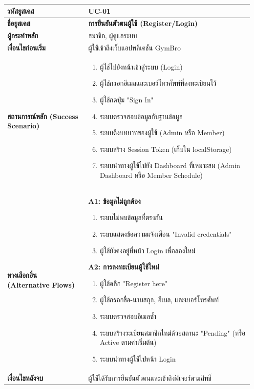 \begin{longtable}{|p{3cm}|p{12cm}|}
\hline
\textbf{รหัสยูสเคส} & UC-01 \\ \hline
\textbf{ชื่อยูสเคส} & \textbf{การยืนยันตัวตนผู้ใช้ (Register/Login)} \\ \hline
\textbf{ผู้กระทำหลัก} & สมาชิก, ผู้ดูแลระบบ \\ \hline
\textbf{เงื่อนไขก่อนเริ่ม} & ผู้ใช้เข้าถึงเว็บแอปพลิเคชัน GymBro \\ \hline
\textbf{สถานการณ์หลัก (Success Scenario)} & 
\begin{enumerate}
    \item ผู้ใช้ไปยังหน้าเข้าสู่ระบบ (Login)
    \item ผู้ใช้กรอกอีเมลและเบอร์โทรศัพท์ที่ลงทะเบียนไว้
    \item ผู้ใช้กดปุ่ม "Sign In"
    \item ระบบตรวจสอบข้อมูลกับฐานข้อมูล
    \item ระบบดึงบทบาทของผู้ใช้ (Admin หรือ Member)
    \item ระบบสร้าง Session Token (เก็บใน localStorage)
    \item ระบบนำทางผู้ใช้ไปยัง Dashboard ที่เหมาะสม (Admin Dashboard หรือ Member Schedule)
\end{enumerate} \\ \hline
\textbf{ทางเลือกอื่น (Alternative Flows)} & 
\textbf{A1: ข้อมูลไม่ถูกต้อง}
\begin{enumerate}
    \item ระบบไม่พบข้อมูลที่ตรงกัน
    \item ระบบแสดงข้อความแจ้งเตือน "Invalid credentials"
    \item ผู้ใช้ยังคงอยู่ที่หน้า Login เพื่อลองใหม่
\end{enumerate}
\textbf{A2: การลงทะเบียนผู้ใช้ใหม่}
\begin{enumerate}
    \item ผู้ใช้คลิก "Register here"
    \item ผู้ใช้กรอกชื่อ-นามสกุล, อีเมล, และเบอร์โทรศัพท์
    \item ระบบตรวจสอบอีเมลซ้ำ
    \item ระบบสร้างระเบียนสมาชิกใหม่ด้วยสถานะ "Pending" (หรือ Active ตามค่าเริ่มต้น)
    \item ระบบนำทางผู้ใช้ไปหน้า Login
\end{enumerate} \\ \hline
\textbf{เงื่อนไขหลังจบ} & ผู้ใช้ได้รับการยืนยันตัวตนและเข้าถึงฟีเจอร์ตามสิทธิ์ \\ \hline
\end{longtable}


